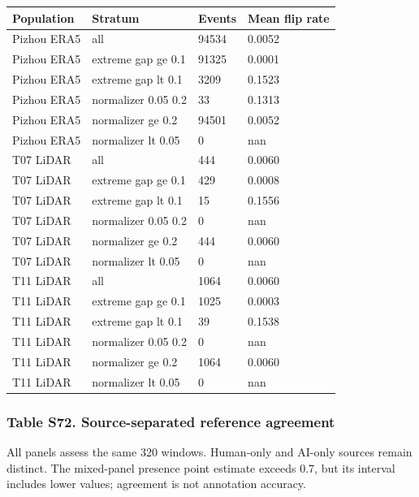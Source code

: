 \documentclass[a4paper,11pt]{article}
\newcounter{none}
\begin{document}
{\def\LTcaptype{none} %
\begin{longtable}[]{@{}llll@{}}
\toprule\noalign{}
Population & Stratum & Events & Mean flip rate \\
\midrule\noalign{}
\endhead
\bottomrule\noalign{}
\endlastfoot
Pizhou ERA5 & all & 94534 & 0.0052 \\
Pizhou ERA5 & extreme gap ge 0.1 & 91325 & 0.0001 \\
Pizhou ERA5 & extreme gap lt 0.1 & 3209 & 0.1523 \\
Pizhou ERA5 & normalizer 0.05 0.2 & 33 & 0.1313 \\
Pizhou ERA5 & normalizer ge 0.2 & 94501 & 0.0052 \\
Pizhou ERA5 & normalizer lt 0.05 & 0 & nan \\
T07 LiDAR & all & 444 & 0.0060 \\
T07 LiDAR & extreme gap ge 0.1 & 429 & 0.0008 \\
T07 LiDAR & extreme gap lt 0.1 & 15 & 0.1556 \\
T07 LiDAR & normalizer 0.05 0.2 & 0 & nan \\
T07 LiDAR & normalizer ge 0.2 & 444 & 0.0060 \\
T07 LiDAR & normalizer lt 0.05 & 0 & nan \\
T11 LiDAR & all & 1064 & 0.0060 \\
T11 LiDAR & extreme gap ge 0.1 & 1025 & 0.0003 \\
T11 LiDAR & extreme gap lt 0.1 & 39 & 0.1538 \\
T11 LiDAR & normalizer 0.05 0.2 & 0 & nan \\
T11 LiDAR & normalizer ge 0.2 & 1064 & 0.0060 \\
T11 LiDAR & normalizer lt 0.05 & 0 & nan \\
\end{longtable}
}

\subsubsection{Table S72. Source-separated reference agreement}\label{table-s72.-source-separated-reference-agreement}

All panels assess the same 320 windows. Human-only and AI-only sources remain distinct. The mixed-panel presence point estimate exceeds 0.7, but its interval includes lower values; agreement is not annotation accuracy.
\end{document}
